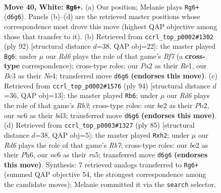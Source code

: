 \documentclass[11pt]{article}
\begin{document}
\clearpage

\begin{figure}[p]\centering
\begin{subfigure}{0.46\textwidth}\centering
\resizebox{\linewidth}{!}{%
\newchessgame
\chessboard[
  setfen={2r3k1/7r/p1nR4/8/1P3P2/2B5/P3b1K1/R7 w - - 13 40},
  showmover=false,
  pgfstyle=straightmove, color=movearrow, markmove={d6-g6}
]}
\caption{}
\end{subfigure}\hfill
\begin{subfigure}{0.46\textwidth}\centering
\resizebox{\linewidth}{!}{%
\newchessgame
\chessboard[
  setfen={8/2k2Bp1/p1r1b3/5n1P/4N3/1P6/1K6/4R3 w - - 3 47},
  showmover=false,
  pgfstyle=straightmove, color=movearrow, markmove={f7-g6}
]}
\caption{}
\end{subfigure}
\\[4pt]
\begin{subfigure}{0.46\textwidth}\centering
\resizebox{\linewidth}{!}{%
\newchessgame
\chessboard[
  setfen={8/4k2p/8/6p1/6P1/1R1b1B1P/1P1r4/6K1 w - - 33 48},
  showmover=false,
  pgfstyle=straightmove, color=movearrow, markmove={b3-b6}
]}
\caption{}
\end{subfigure}\hfill
\begin{subfigure}{0.46\textwidth}\centering
\resizebox{\linewidth}{!}{%
\newchessgame
\chessboard[
  setfen={8/4k1p1/7p/R2p4/3Nb3/3n2P1/1r5P/R4K2 b - - 2 43},
  showmover=false,
  pgfstyle=straightmove, color=movearrow, markmove={b2-h2}
]}
\caption{}
\end{subfigure}
\caption{\textbf{Move 40, White: \texttt{Rg6+}.} (a) Our position; Melanie plays \texttt{Rg6+} (\texttt{d6g6}). Panels (b)--(d) are the retrieved master positions whose correspondence most drove this move (highest QAP objective among those that transfer to it). (b) Retrieved from \texttt{ccrl\_top\_p0002\#1302} (ply 92) [structural distance $d$=38, QAP obj=22]: the master played \texttt{Bg6}; under $\mu$ our \emph{Rd6} plays the role of that game's \emph{Bf7} (a \textbf{cross-type} correspondence); cross-type roles: our \emph{P}a2 as their \emph{R}e1, our \emph{B}c3 as their \emph{N}e4; transferred move \texttt{d6g6} \textbf{(endorses this move)}. (c) Retrieved from \texttt{ccrl\_top\_p0002\#1576} (ply 94) [structural distance $d$=36, QAP obj=13]: the master played \texttt{Rb6}; under $\mu$ our \emph{Rd6} plays the role of that game's \emph{Rb3}; cross-type roles: our \emph{b}e2 as their \emph{P}b2, our \emph{n}c6 as their \emph{b}d3; transferred move \texttt{d6g6} \textbf{(endorses this move)}. (d) Retrieved from \texttt{ccrl\_top\_p0003\#1327} (ply 85) [structural distance $d$=38, QAP obj=5]: the master played \texttt{Rxh2}; under $\mu$ our \emph{Rd6} plays the role of that game's \emph{Rb7}; cross-type roles: our \emph{b}e2 as their \emph{P}h6, our \emph{n}c6 as their \emph{r}a5; transferred move \texttt{d6g6} \textbf{(endorses this move)}. Synthesis: 7 retrieved analogs transferred to \texttt{Rg6+} (summed QAP objective 54, the strongest correspondence among the candidate moves); Melanie committed it via the \texttt{search} selector.}
\label{fig:thought-m78}
\end{figure}
\end{document}
